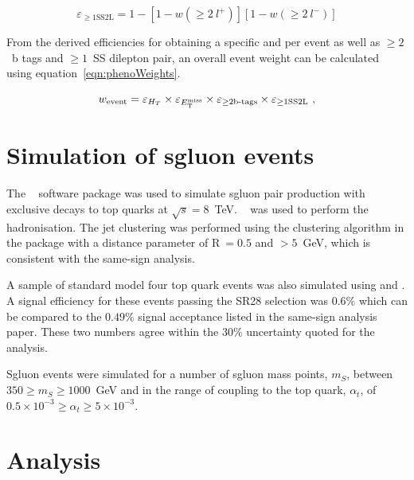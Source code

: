 \begin{equation}
\varepsilon_{\geq1 \text{SS2L}} = 1 - \left[1-w(\geq2~l^{+})\right]\left[1-w(\geq2~l^{-})\right]
\label{eqn:al1}
\end{equation}

From the derived efficiencies for obtaining a specific \HT and \MET per event as well as $\geq2$~b tags and $\geq1$~SS dilepton pair, an overall event weight can be calculated using equation~\ref{eqn:phenoWeights}.

\begin{equation} \label{eqn:phenoWeights}
  w_{\rm event} = \varepsilon_{H_T} \times  \varepsilon_{E_{\mathrm{T}}^{\text{miss}}} \times
    \varepsilon_{\geq\text{2b-tags}} \times \varepsilon_{\geq1 \text{SS2L}} \ ,
\end{equation}

\section{Simulation of sgluon events \label{sec:sgluonSim}}
The \MGfive~\cite{Alwall2014} software package was used to simulate sgluon pair production with exclusive decays to top quarks at $\sqrt{s}=8$~TeV. \PYTHIAsix~\cite{pythia} was used to perform the hadronisation. The jet clustering was performed using the \antikt clustering algorithm in the \FASTJET package with a distance parameter of R$~=0.5$ and \pt$>5$~GeV, which is consistent with the same-sign analysis.

A sample of standard model four top quark events was also simulated using \MGfive and \PYTHIAsix. A signal efficiency for these events passing the SR28 selection was $0.6\%$ which can be compared to the $0.49\%$ signal acceptance listed in the same-sign analysis paper. These two numbers agree within the $30\%$ uncertainty quoted for the analysis.

Sgluon events were simulated for a number of sgluon mass points, $m_{S}$, between $350 \geq m_{S} \geq 1000$~GeV and in the range of coupling to the top quark, $\alpha_{t}$, of $0.5 \times 10^{-3}\geq \alpha_{t} \geq 5 \times 10^{-3}$.

\section{Analysis \label{sec:sgluonAna}}

